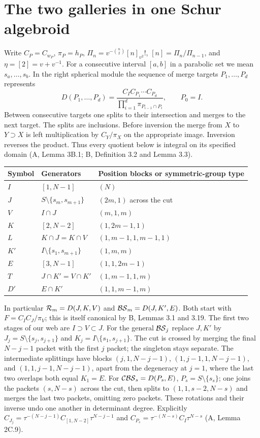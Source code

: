 \section{The two galleries in one Schur algebroid}

Write $C_P=C_{w_P}$, $\pi_P=h_P$, $\Pi_n=v^{-\binom n2}[n]_{v^2}!$,
$[n]=\Pi_n/\Pi_{n-1}$, and $\eta=[2]=v+v^{-1}$. For a consecutive
interval $[a,b]$ in a parabolic set we mean $s_a,\ldots,s_b$.
In the right spherical module the sequence of merge targets
$P_1,\ldots,P_d$ represents
\[
 D(P_1,\ldots,P_d)=
 \frac{C_I C_{P_1}\cdots C_{P_d}}
 {\prod_{i=1}^d\pi_{P_{i-1}\cap P_i}},\qquad P_0=I .
\]
Between consecutive targets one splits to their intersection and
merges to the next target. The splits are inclusions. Before inversion
the merge from $X$ to $Y\supset X$ is left multiplication by
$C_Y/\pi_X$ on the appropriate image. Inversion reverses the product.
Thus every quotient below is integral on its specified domain
(A, Lemma 3B.1; B, Definition 3.2 and Lemma 3.3).

\begin{center}
\begin{tabular}{@{}lll@{}}
Symbol & Generators & Position blocks or symmetric-group type\\
\hline
$I$ & $[1,N-1]$ & $(N)$\\
$J$ & $S\setminus\{s_m,s_{m+1}\}$ & $(2m,1)$ across the cut\\
$V$ & $I\cap J$ & $(m,1,m)$\\
$K$ & $[2,N-2]$ & $(1,2m-1,1)$\\
$L$ & $K\cap J=K\cap V$ & $(1,m-1,1,m-1,1)$\\
$K'$ & $I\setminus\{s_1,s_{m+1}\}$ & $(1,m,m)$\\
$E$ & $[3,N-1]$ & $(1,1,2m-1)$\\
$T$ & $J\cap K'=V\cap K'$ & $(1,m-1,1,m)$\\
$D'$ & $E\cap K'$ & $(1,1,m-1,m)$
\end{tabular}
\end{center}

In particular $\mathcal R_m=D(J,K,V)$ and $\mathcal{BS}_m=D(J,K',E)$. Both start with
$F=C_I C_J/\pi_V$; this is itself canonical by B, Lemmas 3.1 and
3.19. The first two stages of our web are
$I\supset V\subset J$. For the general $\mathcal{BS}_j$ replace $J,K'$ by
$J_j=S\setminus\{s_j,s_{j+1}\}$ and $K_j=I\setminus\{s_1,s_{j+1}\}$.
The cut is crossed by merging the final $N-j-1$ packet with the first
$j$ packet; the singleton stays separate. The intermediate splittings
have blocks $(j,1,N-j-1)$, $(1,j-1,1,N-j-1)$, and
$(1,1,j-1,N-j-1)$, apart from the degeneracy at $j=1$, where the
last two overlaps both equal $K_1=E$. For $\mathcal{CBS}_s=D(P_s,E)$,
$P_s=S\setminus\{s_s\}$; one joins the packets $(s,N-s)$ across
the cut, then splits to $(1,1,s-2,N-s)$ and merges the last two
packets, omitting zero packets. These rotations and their inverse
undo one another in determinant degree. Explicitly
$C_{J_j}=\tau^{-(N-j-1)} C_{[1,N-2]}\tau^{N-j-1}$ and
$C_{P_s}=\tau^{-(N-s)} C_I\tau^{N-s}$ (A, Lemma 2C.9).


